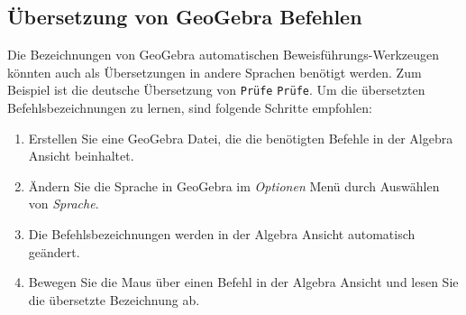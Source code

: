 \documentclass{article}
\begin{document}
\subsection{Übersetzung von GeoGebra Befehlen}

Die Bezeichnungen von GeoGebra automatischen Beweisführungs-Werkzeugen könnten auch als Übersetzungen in andere Sprachen benötigt werden. Zum Beispiel ist die deutsche Übersetzung von \texttt{Prüfe}  \texttt{Pr\"ufe}.
Um die übersetzten Befehlsbezeichnungen zu lernen, sind folgende Schritte empfohlen:

\begin{enumerate}
\item Erstellen Sie eine GeoGebra Datei, die die benötigten Befehle in der Algebra Ansicht beinhaltet.
\item Ändern Sie die Sprache in GeoGebra im \textit{Optionen} Menü durch Auswählen von \textit{Sprache}.
\item Die Befehlsbezeichnungen werden in der Algebra Ansicht automatisch geändert.
\item Bewegen Sie die Maus über einen Befehl in der Algebra Ansicht und lesen Sie die übersetzte Bezeichnung ab.
\end{enumerate}
\end{document}
